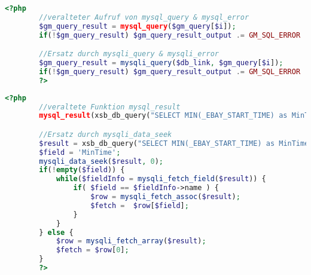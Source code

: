     \begin{lstlisting}[language=php, caption={Beispiel der Ersetzung von \textit{mysql} durch \textit{mysqli}}, label={lst:php7mysqlilow}]
        <?php
        //veralteter Aufruf von mysql_query & mysql_error
        $gm_query_result = mysql_query($gm_query[$i]);
        if(!$gm_query_result) $gm_query_result_output .= GM_SQL_ERROR . mysql_error() . '<br />';

        //Ersatz durch mysqli_query & mysqli_error
        $gm_query_result = mysqli_query($db_link, $gm_query[$i]);
	    if(!$gm_query_result) $gm_query_result_output .= GM_SQL_ERROR . mysqli_error($db_link) . '<br />';
        ?>
    \end{lstlisting}
    \begin{lstlisting}[float=tp, language=php, caption={Beispiel der Ersetzung von \textit{mysql\_result} durch \textit{mysqli}}, label={lst:php7mysqlihard}]
        <?php
        //veraltete Funktion mysql_result
        mysql_result(xsb_db_query("SELECT MIN(_EBAY_START_TIME) as MinTime FROM xtb_auctions"),0,'MinTime');

        //Ersatz durch mysqli_data_seek
        $result = xsb_db_query("SELECT MIN(_EBAY_START_TIME) as MinTime FROM xtb_auctions");
        $field = 'MinTime';
        mysqli_data_seek($result, 0);
        if(!empty($field)) {
            while($fieldInfo = mysqli_fetch_field($result)) {
                if( $field == $fieldInfo->name ) {
                    $row = mysqli_fetch_assoc($result);
                    $fetch =  $row[$field];
                }
            }
        } else {
            $row = mysqli_fetch_array($result);
            $fetch = $row[0];
        }
        ?>
    \end{lstlisting}


